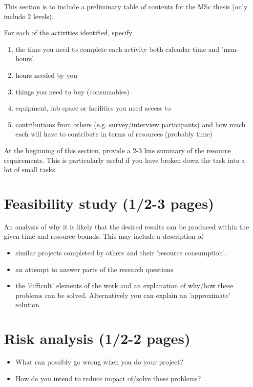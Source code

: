 \documentclass[gjovik]{gucmasterproject}
\begin{document}
This section is to include a preliminary table of contents for the MSc thesis
(only include 2 levels).

For each of the activities identified, specify
\begin{enumerate}
\item  the time you need to complete each activity both calendar time and 'man-hours'.
\item  hours needed by you
\item  things you need to buy (consumables)
\item  equipment, lab space or facilities you need access to
\item  contributions from others (e.g. survey/interview participants) and how much each will have to contribute in terms of resources (probably time)
\end{enumerate}
At the beginning of this section, provide a 2-3 line summary of the
resource requirements.  This is particularly useful if you have broken
down the task into a lot of small tasks.

\chapter{Feasibility study (1/2-3 pages)}
An analysis of why it is likely that the desired
results can be produced within the given time and
resource bounds.  This may include a description of
\begin{itemize}
\item similar projects completed by others and their 'resource consumption',
\item an attempt to answer parts of the research questions
\item the 'difficult' elements of the work and an explanation of why/how these problems can be solved.  
Alternatively you can explain an 'approximate' solution.
\end{itemize}

\chapter{Risk analysis (1/2-2 pages)}
\begin{itemize}
\item What can possibly go wrong when you do your project?
\item How do you intend to reduce impact of/solve these problems?
\end{itemize}
\end{document}
